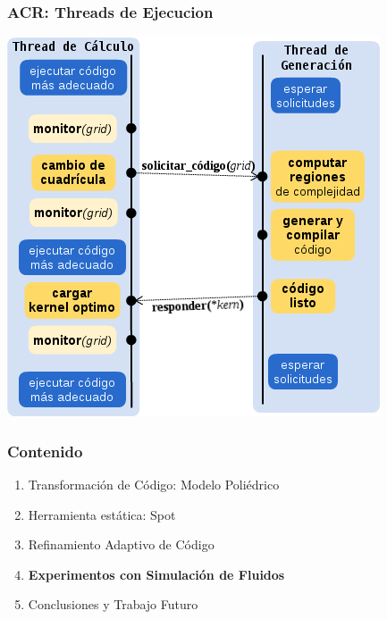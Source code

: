 \documentclass{beamer}\usetheme{Madrid} %
\begin{document}
\begin{frame}
\frametitle{ACR: Threads de Ejecucion}
\begin{center}
\includegraphics[scale=0.5]{img/threads_2.png}
\end{center}
\end{frame}
\begin{frame} 
\frametitle{Contenido} 
\begin{enumerate}
\item Transformación de Código: Modelo Poliédrico
\item Herramienta estática: Spot
\item Refinamiento Adaptivo de Código
\item \textbf{Experimentos con Simulación de Fluidos}
\item Conclusiones y Trabajo Futuro
\end{enumerate}
\end{frame} 
\end{document}
